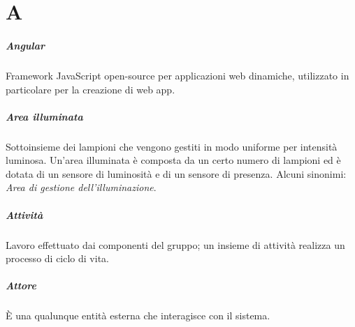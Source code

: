 \chapter{A}

\paragraph*{Angular}
Framework JavaScript open-source per applicazioni web dinamiche, utilizzato in particolare per la creazione di web app.

\paragraph*{Area illuminata}
Sottoinsieme dei lampioni che vengono gestiti in modo uniforme per intensità luminosa. Un'area illuminata è composta da un certo numero di lampioni ed è dotata di un sensore di luminosità e di un sensore di presenza. Alcuni sinonimi: \textit{Area di gestione dell'illuminazione}.

\paragraph*{Attività}
Lavoro effettuato dai componenti del gruppo; un insieme di attività realizza un processo di ciclo di vita.

\paragraph*{Attore}
È una qualunque entità esterna che interagisce con il sistema.
